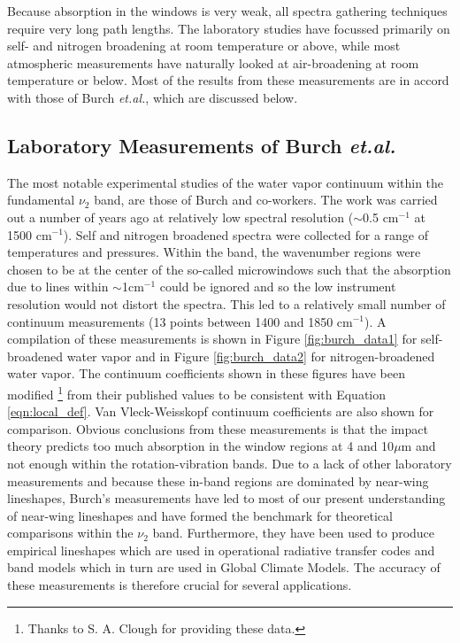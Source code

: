 \documentclass[11pt]{article}
\begin{document}
Because absorption in the windows is very weak, all spectra gathering 
techniques require very long path lengths.  The laboratory studies have 
focussed primarily on self- and nitrogen broadening at room temperature or 
above, while most atmospheric measurements have naturally looked at 
air-broadening at room temperature or below.  Most of the results from 
these measurements are in accord with
those of Burch {\it et.al.}, which are discussed below.

\subsection{Laboratory Measurements of Burch {\it et.al.}}

The most notable experimental studies of the water vapor continuum
within the fundamental $\nu_2$ band, are those of Burch and 
co-workers\cite{bur:67,bur:81,bur:82,bur:84,bur:85}.  
The work was carried out a number of years ago at
relatively low spectral resolution ($\sim$0.5 cm$^{-1}$ at 1500 cm$^{-1}$). 
Self and nitrogen broadened spectra were collected for a range of
temperatures and pressures.  Within the band, 
the wavenumber regions were chosen to be at the center of
the so-called microwindows such that the absorption due to lines within 
$\sim$1cm$^{-1}$ could be ignored and so the low instrument resolution
would not distort the spectra.  This led to a relatively small number of 
continuum measurements (13 points
between 1400 and 1850 cm$^{-1}$).  A compilation of these measurements is
shown in Figure \ref{fig:burch_data1} for self-broadened water vapor and in
Figure \ref{fig:burch_data2} for nitrogen-broadened water vapor.  
The continuum coefficients shown in these figures have been modified
\footnote{Thanks to S. A. Clough for providing these data.} from
their published values to be consistent with Equation \ref{eqn:local_def}.
Van Vleck-Weisskopf continuum coefficients are also shown
for comparison.  Obvious conclusions from these measurements is that the 
impact theory predicts too much absorption in the window regions at 4 and 
10$\mu$m and not enough within the rotation-vibration bands. Due to a lack 
of other laboratory measurements and because these in-band regions are 
dominated by near-wing lineshapes, Burch's measurements have led to most 
of our present understanding of near-wing lineshapes and have formed the
benchmark for theoretical comparisons within the $\nu_2$ band. 
Furthermore, they have been used to
produce empirical lineshapes which are used in operational radiative
transfer codes and band models which in turn are used in Global Climate
Models.  The accuracy of these measurements is therefore crucial for several
applications.
\end{document}
